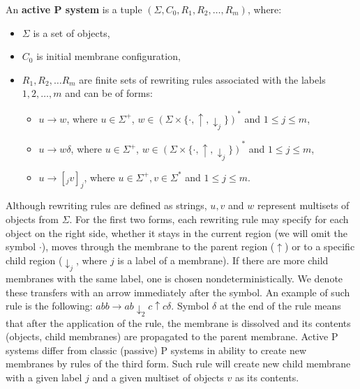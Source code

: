 \begin{definition}
  \label{def:active_p_system}
  An {\bf active P system} is a tuple $(\Sigma, C_0, R_1, R_2, \ldots , R_m)$, where:
  \begin{itemize}
    \item $\Sigma$ is a set of objects,
    \item $C_0$ is initial membrane configuration,
    \item $R_1,R_2,\ldots R_m$ are finite sets of rewriting rules associated with the labels $1,2,\ldots,m$ and can be of forms:
    \begin{itemize}
      \item $u\rightarrow w$, where $u\in \Sigma^+$, $w\in (\Sigma\times\{\cdot, \uparrow, \downarrow_j\})^*$ and $1\leq j\leq m$,
      \item $u\rightarrow w\delta$, where $u\in \Sigma^+$, $w\in (\Sigma\times\{\cdot, \uparrow, \downarrow_j\})^*$ and $1\leq j\leq m$,
      \item $u\rightarrow [_j v]_j$, where $u\in \Sigma^+, v\in \Sigma^*$ and $1\leq j\leq m$.
    \end{itemize}
  \end{itemize}
\end{definition}

Although rewriting rules are defined as strings, $u,v$ and $w$ represent multisets of objects from $\Sigma$. For the first two forms, each rewriting rule may specify for each object on the right side, whether it stays in the current region (we will omit the symbol $\cdot$), moves through the membrane to the parent region ($\uparrow$)
or to a specific child region ($\downarrow_j$, where $j$ is a label of a membrane). If there are more child membranes with the same label, one is chosen nondeterministically.
We denote these transfers with an arrow immediately after the symbol.
An example of such rule is the following: $abb\rightarrow ab\downarrow_2 c\uparrow c\delta$.
Symbol $\delta$ at the end of the rule means that after the application of the rule, the membrane is dissolved and its contents (objects, child membranes) are propagated to the parent membrane.
Active P systems differ from classic (passive) P systems in ability to create new membranes by rules of the third form. Such rule will create new child membrane with a given label $j$ and a given multiset of objects $v$ as its contents.


